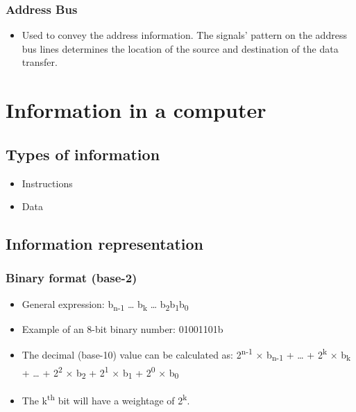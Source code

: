 \documentclass[11pt]{article}
\begin{document}
\subsubsection{Address Bus}
\label{sec:org0a2eb25}
\begin{itemize}
\item Used to convey the address information. The signals' pattern on the address bus lines determines the location of the source and destination of the data transfer.
\end{itemize}


\section{Information in a computer}
\label{sec:orgd953d5a}

\subsection{Types of information}
\label{sec:orgee92a50}
\begin{itemize}
\item Instructions
\item Data
\end{itemize}

 \newpage

\subsection{Information representation}
\label{sec:org310f885}

\subsubsection{Binary format (base-2)}
\label{sec:orgfe3ff55}
\begin{itemize}
\item General expression: b\textsubscript{n-1} \ldots{} b\textsubscript{k} \ldots{} b\textsubscript{2}b\textsubscript{1}b\textsubscript{0}
\item Example of an 8-bit binary number: 01001101b
\item The decimal (base-10) value can be calculated as:
2\textsuperscript{n-1} × b\textsubscript{n-1} + \ldots{} + 2\textsuperscript{k} × b\textsubscript{k} + \ldots{} + 2\textsuperscript{2} × b\textsubscript{2} + 2\textsuperscript{1} × b\textsubscript{1} + 2\textsuperscript{0} × b\textsubscript{0}

\item The k\textsuperscript{th} bit will have a weightage of 2\textsuperscript{k}.
\end{itemize}
\end{document}
